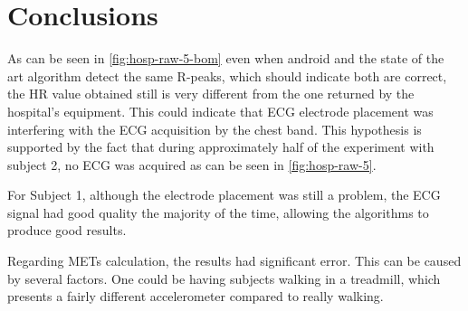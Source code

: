 \FloatBarrier
\section{Conclusions}

As can be seen in \cref{fig:hosp-raw-5-bom} even when android and the state of the art algorithm detect the same R-peaks, which should indicate both are correct, the HR value obtained still is very different from the one returned by the hospital's equipment. This could indicate that ECG electrode placement was interfering with the ECG acquisition by the chest band. This hypothesis is supported by the fact that during approximately half of the experiment with subject 2, no ECG was acquired as can be seen in 	\cref{fig:hosp-raw-5}.

For Subject 1, although the electrode placement was still a problem, the ECG signal had good quality the majority of the time, allowing the algorithms to produce good results.

Regarding METs calculation, the results had significant error. This can be caused by several factors. One could be having subjects walking in a treadmill, which presents a fairly different accelerometer compared to really walking. 


